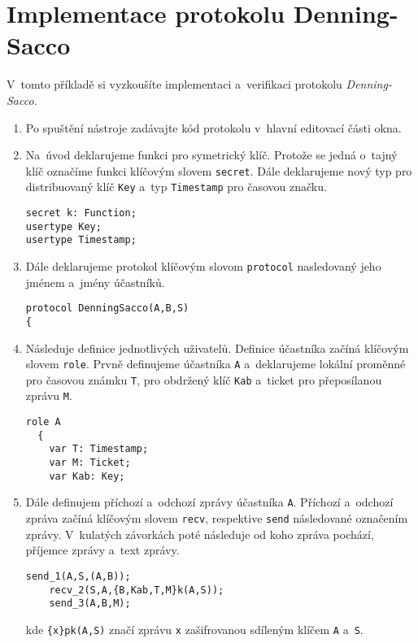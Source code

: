 \section{Implementace protokolu Denning-Sacco}
V~tomto příkladě si vyzkoušíte implementaci a~verifikaci protokolu \emph{Denning-Sacco}.

\begin{enumerate}
  \item Po spuštění nástroje zadávajte kód protokolu v~hlavní editovací části okna.

  \item Na~úvod deklarujeme funkci pro symetrický klíč. Protože se jedná o~tajný
  klíč označíme funkci klíčovým slovem \texttt{secret}. Dále deklarujeme nový typ
  pro distribuovaný klíč \texttt{Key} a~typ \texttt{Timestamp} pro časovou značku.
  \begin{lstlisting}[name=DenningSacco]
secret k: Function;
usertype Key;
usertype Timestamp;
  \end{lstlisting}

  \item Dále deklarujeme protokol klíčovým slovom \texttt{protocol} nasledovaný jeho jménem a~jmény účastníků.
  \begin{lstlisting}[name=DenningSacco]
protocol DenningSacco(A,B,S)
{
  \end{lstlisting}

  \item Následuje definice jednotlivých uživatelů. Definice účastníka začíná klíčovým slovem \texttt{role}.
  Prvně definujeme účastníka \texttt{A} a~deklarujeme lokální proměnné pro časovou známku \texttt{T},
  pro obdržený klíč \texttt{Kab} a~ticket pro přeposílanou zprávu \texttt{M}.
  \begin{lstlisting}[name=DenningSacco]
  role A
  {
    var T: Timestamp;
    var M: Ticket;
    var Kab: Key;
  \end{lstlisting}

  \item Dále definujem příchozí a~odchozí zprávy účastníka \texttt{A}.
  Příchozí a~odchozí zpráva začíná klíčovým slovem \texttt{recv}, respektive \texttt{send} následované označením zprávy.
  V~kulatých závorkách poté následuje od koho zpráva pochází, příjemce zprávy a~text zprávy.
  \begin{lstlisting}[name=DenningSacco]
    send_1(A,S,(A,B));
    recv_2(S,A,{B,Kab,T,M}k(A,S));
    send_3(A,B,M);
  \end{lstlisting}
  kde \texttt{\{x\}pk(A,S)} značí zprávu \texttt{x} zašifrovanou sdíleným klíčem \texttt{A} a~\texttt{S}.


\end{enumerate}
